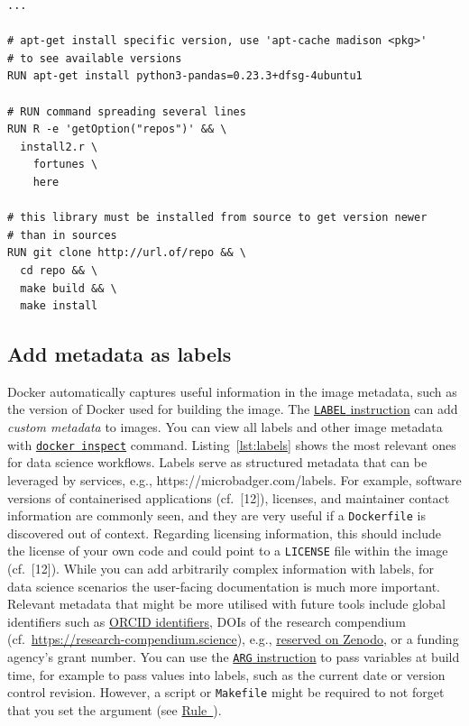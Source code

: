 \documentclass[10pt,letterpaper]{article}
\begin{document}
\begin{minipage}{\linewidth}

\begin{lstlisting}[language=docker,caption={Partial \texttt{Dockerfile} with examples for helpful comments.},breaklines=true,label={lst:comments}]
...

# apt-get install specific version, use 'apt-cache madison <pkg>' 
# to see available versions
RUN apt-get install python3-pandas=0.23.3+dfsg-4ubuntu1

# RUN command spreading several lines
RUN R -e 'getOption("repos")' && \
  install2.r \
    fortunes \
    here

# this library must be installed from source to get version newer
# than in sources
RUN git clone http://url.of/repo && \
  cd repo && \
  make build && \
  make install
\end{lstlisting}

\end{minipage}

\normalsize

\hypertarget{add-metadata-as-labels}{%
\subsection{Add metadata as labels}\label{add-metadata-as-labels}}

Docker automatically captures useful information in the image metadata,
such as the version of Docker used for building the image. The
\href{https://docs.docker.com/engine/reference/builder/\#label}{\texttt{LABEL}
instruction} can add \emph{custom metadata} to images. You can view all
labels and other image metadata with
\href{https://docs.docker.com/engine/reference/commandline/inspect/}{\texttt{docker\ inspect}}
command. Listing~\ref{lst:labels} shows the most relevant ones for data
science workflows. Labels serve as structured metadata that can be
leveraged by services, e.g., https://microbadger.com/labels. For
example, software versions of containerised applications (cf.~{[}12{]}),
licenses, and maintainer contact information are commonly seen, and they
are very useful if a \texttt{Dockerfile} is discovered out of context.
Regarding licensing information, this should include the license of your
own code and could point to a \texttt{LICENSE} file within the image
(cf.~{[}12{]}). While you can add arbitrarily complex information with
labels, for data science scenarios the user-facing documentation is much
more important. Relevant metadata that might be more utilised with
future tools include global identifiers such as
\href{https://orcid.org/}{ORCID identifiers}, DOIs of the research
compendium (cf.~\url{https://research-compendium.science}), e.g.,
\href{https://help.zenodo.org/}{reserved on Zenodo}, or a funding
agency's grant number. You can use the
\href{https://docs.docker.com/engine/reference/builder/\#arg}{\texttt{ARG}
instruction} to pass variables at build time, for example to pass values
into labels, such as the current date or version control revision.
However, a script or \texttt{Makefile} might be required to not forget
that you set the argument (see
\hyperref[{rule:usage}]{Rule~}).
\end{document}
